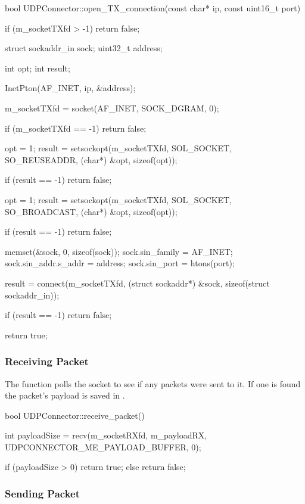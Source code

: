 \begin{codelist}{1}
bool UDPConnector::open_TX_connection(const char* ip, const uint16_t port) {
    if (m_socketTXfd > -1)
        return false;

    struct sockaddr_in sock;
    uint32_t address;

    int opt;
    int result;

    InetPton(AF_INET, ip, &address);

    m_socketTXfd = socket(AF_INET, SOCK_DGRAM, 0);

    if (m_socketTXfd == -1)
        return false;

    opt = 1;
    result = setsockopt(m_socketTXfd, SOL_SOCKET, SO_REUSEADDR, (char*) &opt, sizeof(opt));

    if (result == -1)
        return false;

    opt = 1;
    result = setsockopt(m_socketTXfd, SOL_SOCKET, SO_BROADCAST, (char*) &opt, sizeof(opt));

    if (result == -1)
        return false;

    memset(&sock, 0, sizeof(sock));
    sock.sin_family      = AF_INET;
    sock.sin_addr.s_addr = address;
    sock.sin_port        = htons(port);

    result = connect(m_socketTXfd, (struct sockaddr*) &sock, sizeof(struct sockaddr_in));

    if (result == -1)
        return false;

    return true;
}
\end{codelist}

\subsubsection{Receiving Packet}

The  function polls the socket to see if any \glspl{packet} were sent to it. If one is found the \gls{packet}'s \gls{payload} is saved in .

\begin{codelist}{1}
bool UDPConnector::receive_packet() {
    int payloadSize = recv(m_socketRXfd, m_payloadRX, UDPCONNECTOR_ME_PAYLOAD_BUFFER, 0);

	if (payloadSize > 0)
	    return true;
    else
        return false;
}
\end{codelist}

\subsubsection{Sending Packet}

